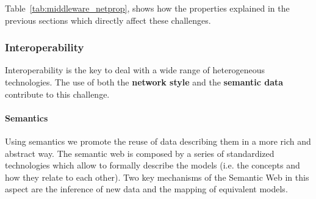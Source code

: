 Table~\ref{tab:middleware_netprop}, shows how the properties explained in the previous sections which directly affect these challenges.







\subsubsection{Interoperability}


Interoperability is the key to deal with a wide range of heterogeneous technologies.
The use of both the \textbf{network style} and the \textbf{semantic data} contribute to this challenge.


\paragraph{Semantics}

Using semantics we promote the reuse of data describing them in a more rich and abstract way.
The semantic web is composed by a series of standardized technologies which allow to formally describe the models (i.e. the concepts and how they relate to each other).
Two key mechanisms of the Semantic Web in this aspect are the inference of new data and the mapping of equivalent models.




